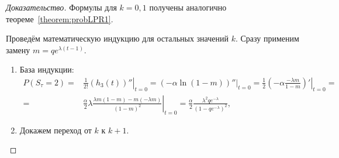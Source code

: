 \documentclass[12pt, specialist, subf, substylefile = spbu_report.rtx]{disser}
\begin{document}
	\begin{proof}[Доказательство]
		Формулы для $k = 0, 1$ получены аналогично теореме~\ref{theorem:probLPR1}.
		
		Проведём математическую индукцию для остальных значений $k$. Сразу применим замену $m = q e ^{\lambda(t - 1)}$.
		
		\begin{enumerate}
			\item База индукции:
			\[
				\begin{aligned}
					P (S _\tau = 2) =& \left.\frac 1 {2 !} \left(h _3(t)\right)''\right| _{t = 0} = \left.\left(-\alpha \ln \left(1 - m \right)\right)''\right| _{t = 0} = \left.\frac 1 2 \left(-\alpha \frac {-\lambda m} {1 - m}\right)' \right| _{t = 0} =\\
					=&  \left.\frac \alpha 2 \lambda \frac {\lambda m \left(1 - m\right) - m \left(-\lambda m\right)} {\left(1 - m\right) ^2}\right| _{t = 0} = \frac \alpha 2 \frac {\lambda ^2 q e ^{-\lambda}} {\left(1 - q e ^{-\lambda}\right) ^2},
				\end{aligned}
			\]
			
			\item Докажем переход от $k$ к $k + 1$.
			

\end{enumerate}
\end{proof}
\end{document}

